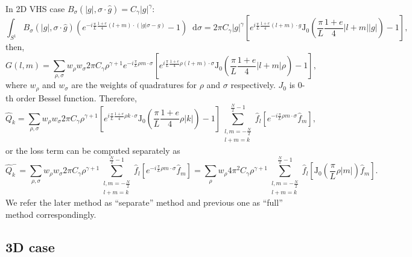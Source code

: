 \documentclass[review, times]{elsarticle}
\newcommand*\diff{\mathop{}\!\mathrm{d}}
\begin{document}
In 2D VHS  case $B_{\sigma}(|g|,\sigma\cdot \hat{g})=C_{\gamma}|g|^{\gamma}$:
\begin{equation}
  \int_{S^1}B_{\sigma}(|g|,\sigma\cdot \hat{g})\left(e^{-i\frac{\pi}{L}\frac{1+e}{4}(l+m)\cdot (|g|\sigma-g)}-1\right)\diff{\sigma}=2\pi C_{\gamma}|g|^{\gamma}\left[ e^{i\frac{\pi}{L}\frac{1+e}{4}(l+m)\cdot g}\text{J}_0\left(\frac{\pi}{L}\frac{1+e}{4}|l+m||g|\right)-1\right],
\end{equation}
then,
\begin{equation}
  G(l,m)=\sum_{\rho,\sigma}w_{\rho}w_{\sigma}2\pi C_{\gamma}\rho^{\gamma+1}e^{-i\frac{\pi}{L}\rho m \cdot \sigma}\left[ e^{i\frac{\pi}{L}\frac{1+e}{4}\rho (l+m)\cdot \sigma}\text{J}_0\left(\frac{\pi}{L}\frac{1+e}{4}|l+m|\rho\right)-1\right],
\end{equation}
where $w_\rho$ and $w_\sigma$ are the weights of quadratures for $\rho$ and $\sigma$ respectively. $J_0$ is $0$-th order Bessel function. Therefore,
\begin{equation} 
  \hat{Q}_k=\sum_{\rho,\sigma}w_{\rho}w_{\sigma}2\pi C_{\gamma}\rho^{\gamma+1}\left[ e^{i\frac{\pi}{L}\frac{1+e}{4}\rho k\cdot \sigma}\text{J}_0\left(\frac{\pi}{L}\frac{1+e}{4}\rho |k|\right)-1\right]\sum_{\substack{l,m=-\frac{N}{2}\\l+m=k}}^{\frac{N}{2}-1}\hat{f}_l \left[e^{-i\frac{\pi}{L}\rho m \cdot \sigma}\hat{f}_m\right],
\end{equation} 
or the loss term can be computed separately as
\begin{equation} 
\hat{Q}_k^-=\sum_{\rho,\sigma}w_{\rho}w_{\sigma}2\pi C_{\gamma}\rho^{\gamma+1}\sum_{\substack{l,m=-\frac{N}{2}\\l+m=k}}^{\frac{N}{2}-1}\hat{f}_l \left[e^{-i\frac{\pi}{L}\rho m \cdot \sigma}\hat{f}_m\right]=\sum_{\rho}w_{\rho}4\pi^2 C_{\gamma}\rho^{\gamma+1}\sum_{\substack{l,m=-\frac{N}{2}\\l+m=k}}^{\frac{N}{2}-1}\hat{f}_l \left[\text{J}_0\left(\frac{\pi}{L}\rho |m|\right)\hat{f}_m\right].
\end{equation}
We refer the later method as ``separate'' method and previous one as ``full'' method correspondingly.

\subsection{3D case}
\end{document}
